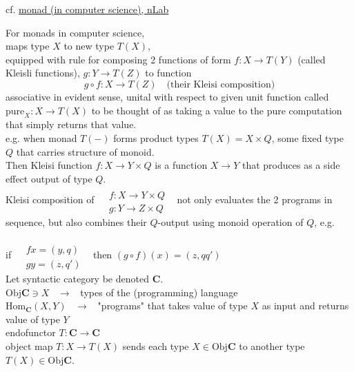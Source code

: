 \documentclass[10pt]{amsart}
\begin{document}
\begin{multicols*}{2}
cf. \href{https://ncatlab.org/nlab/show/monad+%28in+computer+science%29}{monad (in computer science), nLab}

For monads in computer science, \\
maps type $X$ to new type $T(X)$, \\
equipped with rule for composing 2 functions of form $f:X \to T(Y)$ (called Kleisli functions), $g:Y \to T(Z)$ to function 
\[
g\circ f : X \to T(Z) \quad \text{(their Kleisi composition)}
\]
associative in evident sense, unital with respect to given unit function called $\text{pure}_X: X \to T(X)$ to be thought of as taking a value to the pure computation that simply returns that value. \\

e.g. when monad $T(-)$ forms product types $T(X) = X \times Q$, some fixed type $Q$ that carries structure of monoid. \\
Then Kleisi function $f:X \to Y \times Q$ is a function $X\to Y$  that produces as a side effect output of type $Q$. \\
Kleisi composition of $\begin{aligned} &  \quad \\
	& f:X\to Y\times Q \\
	& g: Y \to Z\times Q\end{aligned}$ \, not only evaluates the 2 programs in sequence, but also combines their $Q$-output using monoid operation of $Q$, e.g.
	
	if $\begin{aligned} & \quad \\ 
	& fx = (y, q) \\ 
	& gy = (z,q')\end{aligned}$  \, then $(g\circ f)(x) = (z, qq')$ \\
	
Let syntactic category be denoted $\mathbf{C}$. \\

$\text{Obj}{\mathbf{C}} \ni X$ \quad \, $\to $ \, types of the (programming) language \\
$\text{Hom}_{\mathbf{C}}(X,Y)$ \quad \, $\to $ \, "programs" that takes value of type $X$ as input and returns value of type $Y$ \\

endofunctor $T: \mathbf{C} \to \mathbf{C}$ \\
object map $T:X \to T(X)$ sends each type $X\in \text{Obj}{\mathbf{C}}$ to another type $T(X) \in \text{Obj}{\mathbf{C}}$.  \\


\end{multicols*}
\end{document}
